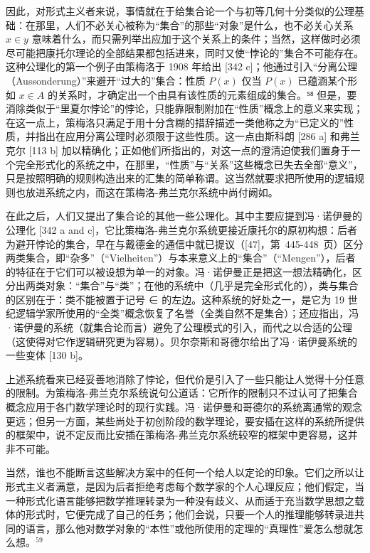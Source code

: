 因此，对形式主义者来说，事情就在于给集合论一个与初等几何十分类似的公理基础：在那里，人们不必关心被称为“集合”的那些“对象”是什么，也不必关心关系 \(x \in y\) 意味着什么，而只需列举出应加于这个关系上的条件；当然，这样做时必须尽可能把康托尔理论的全部结果都包括进来，同时又使“悖论的”集合不可能存在。这种公理化的第一个例子由策梅洛于 1908 年给出 {[}342 c{]}；他通过引入“分离公理（Aussonderung）”来避开“过大的”集合：性质 \(P(x)\) 仅当 \(P(x)\) 已蕴涵某个形如 \(x \in A\) 的关系时，才确定出一个由具有该性质的元素组成的集合。⁵⁸ 但是，要消除类似于“里夏尔悖论”的悖论，只能靠限制附加在“性质”概念上的意义来实现；在这一点上，策梅洛只满足于用十分含糊的措辞描述一类他称之为“已定义的”性质，并指出在应用分离公理时必须限于这些性质。这一点由斯科朗 {[}286 a{]} 和弗兰克尔 {[}113 b{]} 加以精确化；正如他们所指出的，对这一点的澄清迫使我们置身于一个完全形式化的系统之中，在那里，“性质”与“关系”这些概念已失去全部“意义”，只是按照明确的规则构造出来的汇集的简单称谓。这当然就要求把所使用的逻辑规则也放进系统之内，而这在策梅洛-弗兰克尔系统中尚付阙如。

在此之后，人们又提出了集合论的其他一些公理化。其中主要应提到冯·诺伊曼的公理化 {[}342 a and c{]}，它比策梅洛-弗兰克尔系统更接近康托尔的原初构想：后者为避开悖论的集合，早在与戴德金的通信中就已提议（{[}47{]}，第~445-448~页）区分两类集合，即“杂多”（“Vielheiten”）与本来意义上的“集合”（“Mengen”），后者的特征在于它们可以被设想为单一的对象。冯·诺伊曼正是把这一想法精确化，区分出两类对象：“集合”与“类”；在他的系统中（几乎是完全形式化的），类与集合的区别在于：类不能被置于记号 ∈ 的左边。这种系统的好处之一，是它为 19 世纪逻辑学家所使用的“全类”概念恢复了名誉（全类自然不是集合）；还应指出，冯·诺伊曼的系统（就集合论而言）避免了公理模式的引入，而代之以合适的公理（这使得对它作逻辑研究更为容易）。贝尔奈斯和哥德尔给出了冯·诺伊曼系统的一些变体 {[}130 b{]}。

上述系统看来已经妥善地消除了悖论，但代价是引入了一些只能让人觉得十分任意的限制。为策梅洛-弗兰克尔系统说句公道话：它所作的限制只不过认可了把集合概念应用于各门数学理论时的现行实践。冯·诺伊曼和哥德尔的系统离通常的观念更远；但另一方面，某些尚处于初创阶段的数学理论，要安插在这样的系统所提供的框架中，说不定反而比安插在策梅洛-弗兰克尔系统较窄的框架中更容易，这并非不可能。

当然，谁也不能断言这些解决方案中的任何一个给人以定论的印象。它们之所以让形式主义者满意，是因为后者拒绝考虑每个数学家的个人心理反应；他们假定，当一种形式化语言能够把数学推理转录为一种没有歧义、从而适于充当数学思想之载体的形式时，它便完成了自己的任务；他们会说，只要一个人的推理能够转录进共同的语言，那么他对数学对象的“本性”或他所使用的定理的“真理性”爱怎么想就怎么想。\(^{59}\)

